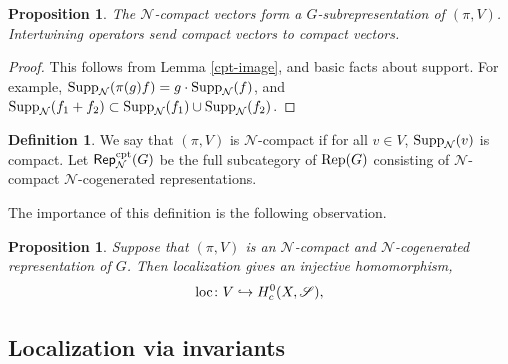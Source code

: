\documentclass[letter]{amsart}
\newtheorem{proposition}[thm]{Proposition}
\theoremstyle{definition}
\newtheorem{definition}[thm]{Definition}
\theoremstyle{remark}
\numberwithin{thm}{section}
\numberwithin{equation}{section}
\renewcommand{\NN}{{\mathcal N}}
\DeclareMathOperator{\cpt}{cpt}
\begin{document}
\begin{proposition}
The $\NN$-compact vectors form a $G$-subrepresentation of $(\pi, V)$.  Intertwining operators send compact vectors to compact vectors.
\end{proposition}
\begin{proof}
This follows from Lemma \ref{cpt-image}, and basic facts about support.  For example, $\Supp_\NN( \pi(g) f) = g \cdot \Supp_\NN(f)$, and $\Supp_\NN(f_1 + f_2) \subset \Supp_\NN(f_1) \cup \Supp_\NN(f_2)$.
\end{proof}

\begin{definition}
We say that $(\pi, V)$ is $\NN$-compact if for all $v \in V$, $\Supp_\NN(v)$ is compact.  Let $\Cat{Rep}_\NN^{\cpt}(G)$ be the full subcategory of $\operatorname{Rep}(G)$ consisting of $\NN$-compact $\NN$-cogenerated representations.
\end{definition}

The importance of this definition is the following observation.
\begin{proposition}
\label{inj-loc}
Suppose that $(\pi, V)$ is an $\NN$-compact and $\NN$-cogenerated representation of $G$.  Then localization gives an injective homomorphism,
$$\operatorname{loc} \colon V \hookrightarrow H_c^0(X, {\mathscr{S}}),$$
\end{proposition}

\subsection{Localization via invariants}
\end{document}
